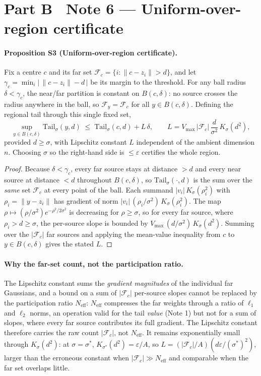 \documentclass[10pt,twocolumn]{article}
\newcommand{\Ksig}{K_{\sigma}}
\newcommand{\sstar}{\sigma^{*}}
\newcommand{\Neff}{N_{\mathrm{eff}}}
\begin{document}
\section*{Part B \textperiodcentered\ Note 6 --- Uniform-over-region certificate}
\paragraph{Proposition S3 (Uniform-over-region certificate).}
Fix a centre $c$ and its far set $\mathcal{F}_c=\{i:\lVert c-z_i\rVert>d\}$, and let $\gamma_c=\min_i\big|\,\lVert c-z_i\rVert-d\,\big|$ be its margin to the threshold. For any ball radius $\delta<\gamma_c$, the near/far partition is constant on $B(c,\delta)$: no source crosses the radius anywhere in the ball, so $\mathcal{F}_y=\mathcal{F}_c$ for all $y\in B(c,\delta)$. Defining the regional tail through this single fixed set,
\begin{equation}
\sup_{y\in B(c,\delta)}\mathrm{Tail}_\sigma(y,d)\;\le\;\mathrm{Tail}_\sigma(c,d)+L\,\delta,\qquad L=V_{\max}\,|\mathcal{F}_c|\,\frac{d}{\sigma^2}\,\Ksig(d^2),
\end{equation}
provided $d\ge\sigma$, with Lipschitz constant $L$ independent of the ambient dimension $n$. Choosing $\sigma$ so the right-hand side is $\le\varepsilon$ certifies the whole region.
\begin{proof}
Because $\delta<\gamma_c$, every far source stays at distance $>d$ and every near source at distance $<d$ throughout $B(c,\delta)$, so $\mathrm{Tail}_\sigma(\cdot,d)$ is the sum over the \emph{same} set $\mathcal{F}_c$ at every point of the ball. Each summand $|v_i|\,\Ksig(\rho_i^2)$ with $\rho_i=\lVert y-z_i\rVert$ has gradient of norm $|v_i|\,(\rho_i/\sigma^2)\,\Ksig(\rho_i^2)$. The map $\rho\mapsto(\rho/\sigma^2)e^{-\rho^2/2\sigma^2}$ is decreasing for $\rho\ge\sigma$, so for every far source, where $\rho_i>d\ge\sigma$, the per-source slope is bounded by $V_{\max}\,(d/\sigma^2)\,\Ksig(d^2)$. Summing over the $|\mathcal{F}_c|$ far sources and applying the mean-value inequality from $c$ to $y\in B(c,\delta)$ gives the stated $L$.
\end{proof}

\paragraph{Why the far-set count, not the participation ratio.} The Lipschitz constant sums the \emph{gradient magnitudes} of the individual far Gaussians, and a bound on a sum of $|\mathcal{F}_c|$ per-source slopes cannot be replaced by the participation ratio $\Neff$: $\Neff$ compresses the far weights through a ratio of $\ell_1$ and $\ell_2$ norms, an operation valid for the tail \emph{value} (Note 1) but not for a sum of slopes, where every far source contributes its full gradient. The Lipschitz constant therefore carries the raw count $|\mathcal{F}_c|$, not $\Neff$. It remains exponentially small through $\Ksig(d^2)$: at $\sigma=\sstar$, $K_{\sstar}(d^2)=\varepsilon/A$, so $L=(|\mathcal{F}_c|/A)(d\varepsilon/(\sstar)^2)$, larger than the erroneous constant when $|\mathcal{F}_c|\gg\Neff$ and comparable when the far set overlaps little.
\end{document}
